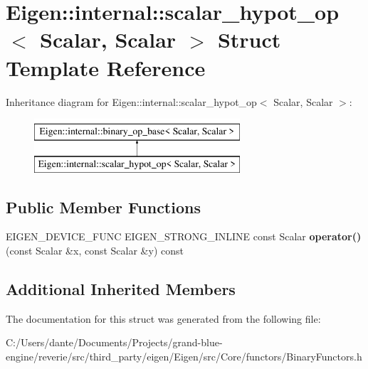\hypertarget{struct_eigen_1_1internal_1_1scalar__hypot__op_3_01_scalar_00_01_scalar_01_4}{}\section{Eigen\+::internal\+::scalar\+\_\+hypot\+\_\+op$<$ Scalar, Scalar $>$ Struct Template Reference}
\label{struct_eigen_1_1internal_1_1scalar__hypot__op_3_01_scalar_00_01_scalar_01_4}
Inheritance diagram for Eigen\+::internal\+::scalar\+\_\+hypot\+\_\+op$<$ Scalar, Scalar $>$\+:\begin{figure}[H]
\begin{center}
\leavevmode
\includegraphics[height=2.000000cm]{struct_eigen_1_1internal_1_1scalar__hypot__op_3_01_scalar_00_01_scalar_01_4}
\end{center}
\end{figure}
\subsection*{Public Member Functions}
\begin{DoxyCompactItemize}
\item 
\mbox{\label{struct_eigen_1_1internal_1_1scalar__hypot__op_3_01_scalar_00_01_scalar_01_4_a995da90e09c873328c9db1ef0e1bc48c}} 
E\+I\+G\+E\+N\+\_\+\+D\+E\+V\+I\+C\+E\+\_\+\+F\+U\+NC E\+I\+G\+E\+N\+\_\+\+S\+T\+R\+O\+N\+G\+\_\+\+I\+N\+L\+I\+NE const Scalar {\bfseries operator()} (const Scalar \&x, const Scalar \&y) const
\end{DoxyCompactItemize}
\subsection*{Additional Inherited Members}


The documentation for this struct was generated from the following file\+:\begin{DoxyCompactItemize}
\item 
C\+:/\+Users/dante/\+Documents/\+Projects/grand-\/blue-\/engine/reverie/src/third\+\_\+party/eigen/\+Eigen/src/\+Core/functors/Binary\+Functors.\+h\end{DoxyCompactItemize}
